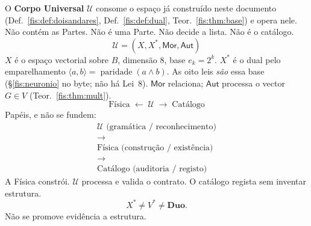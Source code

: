 \documentclass[livro.tex]{subfiles}
\begin{document}
\begin{definicao}\label{fis:def:U}
O \textbf{Corpo Universal} $\mathcal{U}$ consome o espaço já construído
neste documento (Def.~\ref{fis:def:doisandares}, Def.~\ref{fis:def:dual},
Teor.~\ref{fis:thm:base}) e opera nele. Não contém as Partes.
Não é uma Parte. Não decide a lista. Não é o catálogo.
\[
\boxed{\;\mathcal{U}=(X,X^{*},\mathsf{Mor},\mathsf{Aut})\;}
\]
$X$ é o espaço vectorial sobre $B$, dimensão $8$, base
$e_k=2^{k}$. $X^{*}$ é o dual pelo emparelhamento
$\langle a,b\rangle=\operatorname{paridade}(a\wedge b)$.
As oito leis \emph{são} essa base (§\ref{fis:neuronio} no byte;
não há Lei~8). $\mathsf{Mor}$ relaciona;
$\mathsf{Aut}$ processa o vector $G\in V$ (Teor.~\ref{fis:thm:mult}).
\[
\boxed{\;\text{Física}\;\longleftarrow\;\mathcal{U}\;\longrightarrow\;\text{Catálogo}\;}
\]
Papéis, e não se fundem:
\[
\boxed{\;
\begin{array}{c}
\mathcal{U}\text{ (gramática / reconhecimento)}\\[2pt]
\longrightarrow\\[2pt]
\text{Física (construção / existência)}\\[2pt]
\longrightarrow\\[2pt]
\text{Catálogo (auditoria / registo)}
\end{array}
\;}
\]
A Física constrói. \(\mathcal{U}\) processa e valida o contrato.
O catálogo regista sem inventar estrutura.
\[
\boxed{\;X^{*}\neq V^{*}\neq\mathbf{Duo}.\;}
\]
Não se promove evidência a estrutura.
\end{definicao}
\end{document}
